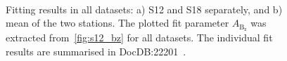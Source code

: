 \documentclass[12pt]{article}
\begin{document}
\begin{figure}[htpb]
    \centering
     \\  
    \vspace{-0.2cm}
    \caption{Fitting results in all  datasets: a) S12 and S18 separately, and b) mean of the two stations. The plotted fit parameter $A_{\mathrm{B_z}}$ was extracted from~\cref{fig:s12_bz} for all datasets. The individual fit results are summarised in DocDB:22201~\cite{Gleb_docdb}.}
    \label{fig:bz}
\end{figure}
\end{document}
